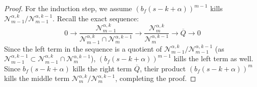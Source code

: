 \begin{proof}
    For the induction step, we assume $(b_f(s-k+\alpha))^{m-1}$ kills $\mathcal{N}_{m-1}^{\alpha,k} \big/ \mathcal{N}_{m-1}^{\alpha,k-1}$. Recall the exact sequence:
    $$
        0\longrightarrow \frac{\mathcal{N}_{m-1}^{\alpha,k}}{\mathcal{N}_{m-1}^{\alpha,k} \cap \mathcal{N}_m^{\alpha,k-1}} \longrightarrow \frac{\mathcal{N}_m^{\alpha,k}}{\mathcal{N}_m^{\alpha,k-1}} \longrightarrow \overline{Q} \longrightarrow 0
    $$
    Since the left term in the sequence is a quotient of $\mathcal{N}_{m-1}^{\alpha,k} \big/ \mathcal{N}_{m-1}^{\alpha,k-1}$ (as $\mathcal{N}_{m-1}^{\alpha,k-1} \subset \mathcal{N}_{m-1}^{\alpha,k} \cap \mathcal{N}_m^{\alpha,k-1}$), $(b_f(s-k+\alpha))^{m-1}$ kills the left term as well.
    Since $b_{f}(s-k+\alpha)$ kills the right term $\overline{Q}$, their product $(b_f(s-k+\alpha))^{m}$ kills the middle term $\mathcal{N}_m^{\alpha,k} \big/ \mathcal{N}_m^{\alpha,k-1}$, completing the proof.

\end{proof}

